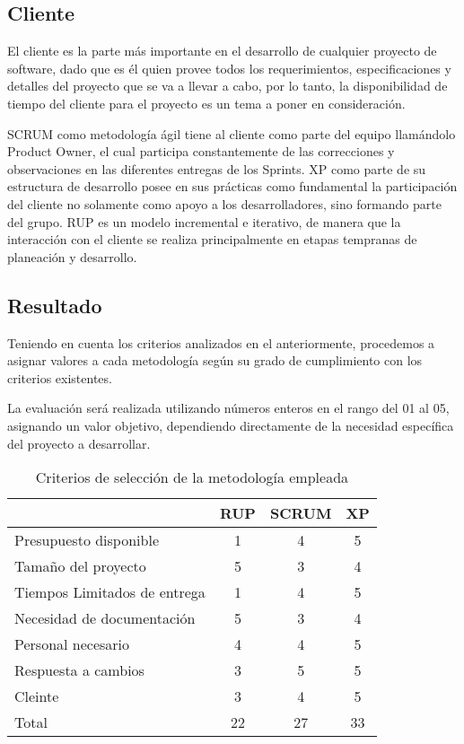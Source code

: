 \documentclass[12pt,a4paper]{article}
\newcommand{\espacio}{\par\vspace{3mm}}
\begin{document}
\subsection*{Cliente}
El cliente es la parte más importante en el desarrollo de cualquier proyecto de software, dado que es él quien provee todos los requerimientos, especificaciones y detalles del proyecto que se va a llevar a cabo, por lo tanto, la disponibilidad de tiempo del cliente para el proyecto es un tema a poner en consideración.
\espacio
SCRUM como metodología ágil tiene al cliente como parte del equipo llamándolo Product Owner, el cual participa constantemente de las correcciones y observaciones en las
diferentes entregas de los Sprints. XP como parte de su estructura de desarrollo posee en sus prácticas como fundamental la participación del cliente no solamente como apoyo a los desarrolladores, sino formando parte del grupo. RUP es un modelo incremental e iterativo, de manera que la interacción con el cliente se realiza principalmente en etapas tempranas de planeación y desarrollo.

\newpage
\subsection*{Resultado}
Teniendo en cuenta los criterios analizados en el anteriormente, procedemos a asignar valores a cada metodología según su grado de cumplimiento con los criterios existentes.
\espacio La evaluación será realizada utilizando números enteros en el rango del 01 al 05, asignando un valor objetivo, dependiendo directamente de la necesidad específica del proyecto a desarrollar.
\begin{table}[h]
    \centering
\begin{tabular}{|l|c|c|c|}
\hline
 &                           RUP & SCRUM & XP \\
\hline
Presupuesto disponible &           1  & 4 & 5 \\
\hline
Tamaño del proyecto &              5  & 3 &  4\\
\hline
Tiempos Limitados de entrega &     1  &4  & 5 \\
\hline
Necesidad de documentación &        5 & 3 & 4 \\
\hline
Personal necesario &               4 &4  & 5 \\
\hline
Respuesta a cambios &              3 & 5  & 5 \\
\hline
Cleinte &                           3 &  4 & 5       \\
\hline
Total &                           22 &  27 & 33      \\
\hline
\end{tabular}
\caption{Criterios de selección de la metodología empleada}
\end{table}
\end{document}
